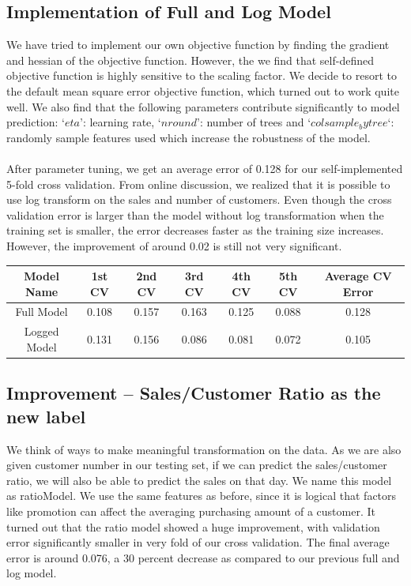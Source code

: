 \documentclass{article}
\begin{document}
\subsection{Implementation of Full and Log Model}
We have tried to implement our own objective function by finding the gradient and hessian of the objective function. However, the we find that self-defined objective function is highly sensitive to the scaling factor. We decide to resort to the default mean square error objective function, which turned out to work quite well. We also find that the following parameters contribute significantly to model prediction: $‘eta’$: learning rate, $‘nround’$: number of trees  and $‘colsample_bytree‘$: randomly sample features used which increase the robustness of the model. \\
\\
After parameter tuning, we get an average error of 0.128 for our self-implemented 5-fold cross validation. From online discussion, we realized that it is possible to use log transform on the sales and number of customers. Even though the cross validation error is larger than the model without log transformation when the training set is smaller, the error decreases faster as the training size increases. However, the improvement of around 0.02 is still not very significant.

\begin{center}
 \begin{tabular}{||c c c c c c c||} 
 \hline
 Model Name & 1st CV & 2nd CV & 3rd CV & 4th CV & 5th CV & Average CV Error \\ [0.5ex] 
 \hline\hline
 Full Model & 0.108 & 0.157 & 0.163 & 0.125 & 0.088 & 0.128 \\ 
 \hline
 Logged Model & 0.131 & 0.156 & 0.086 & 0.081 & 0.072 & 0.105 \\ [1ex] 
 \hline
\end{tabular}
\end{center}

\subsection{Improvement -- Sales/Customer Ratio as the new label}
We think of ways to make meaningful transformation on the data. As we are also given customer number in our testing set, if we can predict the sales/customer ratio, we will also be able to predict the sales on that day. We name this model as ratioModel. We use the same features as before, since it is logical that factors like promotion can affect the averaging purchasing amount of a customer. It turned out that the ratio model showed a huge improvement, with validation error significantly smaller in very fold of our cross validation. The final average error is around 0.076, a 30 percent decrease as compared to our previous full and log model. \\
\end{document}
